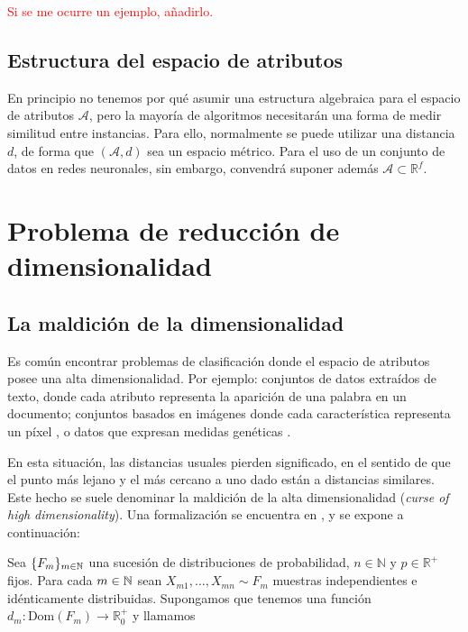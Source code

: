 \begin{example}
\textcolor{red}{Si se me ocurre un ejemplo, añadirlo.}
\end{example}

\subsection{Estructura del espacio de
atributos}\label{estructura-del-espacio-de-atributos}

En principio no tenemos por qué asumir una estructura algebraica para el
espacio de atributos \(\mathcal A\), pero la mayoría de algoritmos
necesitarán una forma de medir similitud entre instancias. Para ello,
normalmente se puede utilizar una distancia \(d\), de forma que
\((\mathcal A,d)\) sea un espacio métrico. Para el uso de un conjunto de
datos en redes neuronales, sin embargo, convendrá suponer además
\(\mathcal A\subset \mathbb R^f\).

\section{Problema de reducción de
dimensionalidad}\label{problema-de-reducciuxf3n-de-dimensionalidad}

\subsection{La maldición de la
dimensionalidad}\label{la-maldiciuxf3n-de-la-dimensionalidad}

Es común encontrar problemas de clasificación donde el espacio de
atributos posee una alta dimensionalidad. Por ejemplo: conjuntos de
datos extraídos de texto, donde cada atributo representa la aparición de
una palabra en un documento; conjuntos basados en imágenes donde cada
característica representa un píxel \autocite{mnist}, o datos que
expresan medidas genéticas \autocite{clarke2008}.

En esta situación, las distancias usuales pierden significado, en el
sentido de que el punto más lejano y el más cercano a uno dado están a
distancias similares. Este hecho se suele denominar la maldición de la
alta dimensionalidad (\emph{curse of high dimensionality}). Una
formalización se encuentra en \textcite{beyer1999}, y se expone a
continuación:

\theob
Sea \(\{F_{m}\}_{m\in\mathbb{N}}\) una sucesión de distribuciones de
probabilidad, \(n\in \mathbb N\) y \(p\in\mathbb R^+\) fijos. Para cada
\(m\in\mathbb{N}\) sean \(X_{m1},\dots,X_{mn}\sim F_m\) muestras independientes
e idénticamente distribuidas. Supongamos que tenemos una función
\(d_m:\mathrm{Dom}(F_m)\rightarrow \mathbb R^+_0\) y llamamos

